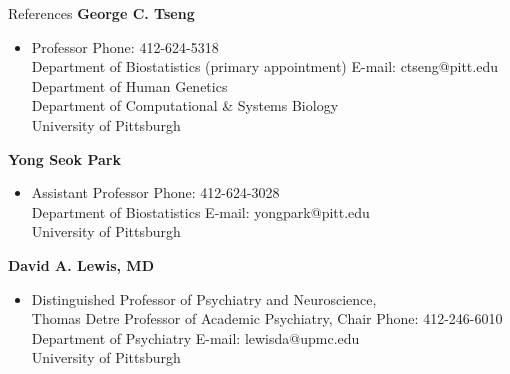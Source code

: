 \documentclass{resume} %
\begin{document}

\begin{rSection}{References}
\textbf{George C. Tseng}
\begin{itemize}[noitemsep,topsep=0pt]
\item[] Professor \hfill {Phone: 412-624-5318}\\
Department of Biostatistics (primary appointment) \hfill{E-mail: ctseng@pitt.edu }\\
Department of Human Genetics \\
Department of Computational \& Systems Biology 
\\
University of Pittsburgh
\end{itemize}

\textbf{Yong Seok Park}
\begin{itemize}[noitemsep,topsep=0pt]
\item[] Assistant Professor \hfill {Phone: 412-624-3028}\\
Department of Biostatistics \hfill{E-mail: yongpark@pitt.edu}\\
University of Pittsburgh
\end{itemize}

\textbf{David A. Lewis, MD}
\begin{itemize}[noitemsep,topsep=0pt]
\item[] Distinguished Professor of Psychiatry and Neuroscience, \\
Thomas Detre Professor of Academic Psychiatry, Chair  
\hfill {Phone: 412-246-6010}\\
Department of Psychiatry \hfill{E-mail: lewisda@upmc.edu}\\
University of Pittsburgh
\end{itemize}

\end{rSection}






\end{document}
